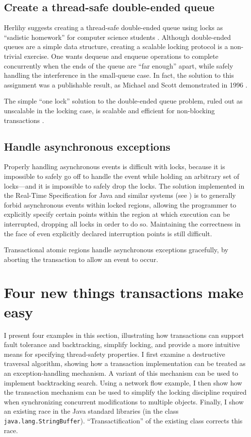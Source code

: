 \subsection{Create a thread-safe double-ended queue}
Herlihy suggests creating a thread-safe double-ended queue using locks
as ``sadistic homework'' for computer science students \cite{Herlihy05}.
Although double-ended queues are a simple data structure,
creating a scalable locking protocol is a
non-trivial exercise.  One wants dequeue and enqueue operations to
complete concurrently when the ends of the queue are ``far enough''
apart, while safely handling the interference in the small-queue case.
In fact, the solution to this assignment was a publishable result, as
Michael and Scott demonstrated in 1996 \cite{MichaelSc96}.

The simple ``one lock'' solution to the double-ended queue
problem, ruled out as unscalable in the locking case, is scalable and
efficient for non-blocking transactions \cite{HerlihyLuMo03,Herlihy05}.

\subsection{Handle asynchronous exceptions}
Properly handling asynchronous events is difficult with locks, because
it is impossible to safely go off to handle the event while holding an
arbitrary set of locks---and it is impossible to safely drop the
locks.  The solution implemented in the Real-Time Specification for
Java \cite{BollellaBrGoDiFuTu00}
and similar systems (see \cite[section 9]{MarlowPeMoRe01}) is to generally forbid asynchronous events within
locked regions, allowing the programmer to explicitly specify certain
points within the region at which execution can be interrupted,
dropping all locks in order to do so.  Maintaining the correctness
in the face of even explicitly declared interruption points is still
difficult.

Transactional atomic regions handle asynchronous exceptions
gracefully, by aborting the transaction to allow an
event to occur.

\section{Four new things transactions make easy}

I present four examples in this section, illustrating how transactions
can support fault tolerance and backtracking, simplify locking, and
provide a more intuitive means for specifying thread-safety
properties.  I first examine a destructive traversal algorithm,
showing how a transaction implementation can be treated as an
exception-handling mechanism.  A variant of this mechanism can be used
to implement backtracking search.  Using a network flow example, I
then show how the transaction mechanism can be used to simplify the
locking discipline required when synchronizing concurrent
modifications to multiple objects.  Finally, I show an existing race
in the Java standard libraries (in the class
\texttt{java.lang.StringBuffer}).  ``Transactification'' of the
existing class corrects this race.

